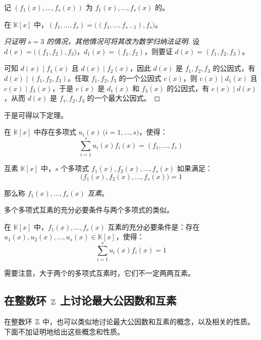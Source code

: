 记 $(f_1(x), \ldots, f_s(x))$ 为 $f_1(x), \ldots, f_s(x)$ 的\emph{}。

\begin{proposition}
	在 $\mathbb K[x]$ 中，$(f_1, \ldots, f_s) = \bigl( (f_1, \ldots, f_{s - 1}), f_s \bigr)$。
\end{proposition}

\begin{proof}[只证明 $s = 3$ 的情况，其他情况可将其改为数学归纳法证明]
	设 $d(x) = \bigl( (f_1, f_2), f_3 \bigr)$，$d_1(x) = (f_1, f_2)$，则要证 $d(x) = (f_1, f_2, f_3)$。

	可知 $d(x) \mid f_1(x)$ 且 $d(x) \mid f_2(x)$，因此 $d(x)$ 是 $f_1, f_2, f_3$ 的公因式，有 $d(x) \mid (f_1, f_2, f_3)$。任取 $f_1, f_2, f_3$ 的一个公因式 $c(x)$，则 $c(x) \mid d_1(x)$ 且 $c(x) \mid f_3(x)$，于是 $c(x)$ 是 $d_1(x)$ 和 $f_3(x)$ 的公因式，有 $c(x) \mid d(x)$，从而 $d(x)$ 是 $f_1, f_2, f_3$ 的一个最大公因式。
\end{proof}

于是可得以下定理。

\begin{proposition}
	在 $\mathbb K[x]$ 中存在多项式 $u_i(x) \pod{i = 1, \ldots, s}$，使得：
	$$
	\sum\limits_{i = 1}^s u_i(x) f_i(x) = (f_1, \ldots, f_s)
	$$
\end{proposition}

\begin{definition}{互素}
	$\mathbb K[x]$ 中，$s$ 个多项式 $f_1(x), f_2(x), \ldots, f_s(x)$ 如果满足：
	$$
	\bigl( f_1(x), f_2(x), \ldots, f_s(x) \bigr) = 1
	$$

	那么称 $f_1(x), \ldots, f_s(x)$ \emph{互素}。
\end{definition}

多个多项式互素的充分必要条件与两个多项式的类似。

\begin{proposition}[互素的充分必要条件]
	在 $\mathbb K[x]$ 中，$f_1(x), \ldots, f_s(x)$ 互素的充分必要条件是：存在 $u_1(x), u_2(x), \ldots, u_s(x) \in \mathbb K[x]$，使得：
	$$
	\sum\limits_{i = 1}^s u_i(x) f_i(x) = 1
	$$
\end{proposition}

需要注意，大于两个的多项式互素时，它们不一定两两互素。

\subsection{在整数环 $\mathbb Z$ 上讨论最大公因数和互素}

在整数环 $\mathbb Z$ 中，也可以类似地讨论最大公因数和互素的概念，以及相关的性质。下面不加证明地给出这些概念和性质。

